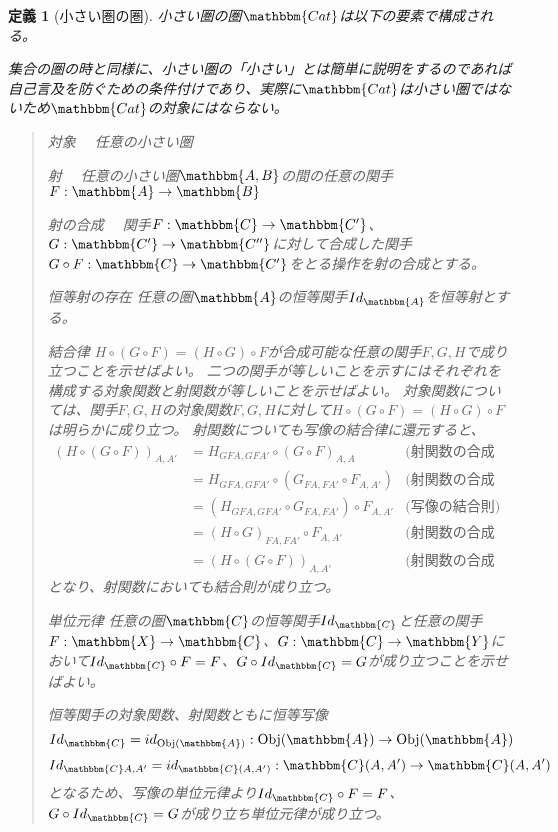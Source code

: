 \documentclass[uplatex,dvipdfmx]{jsarticle}
\newcommand{\cat}[1]{\mathbbm{#1}}
\newcommand{\arrow}{\rightarrow}
\newcommand{\functor}[3]{#1:\cat{#2}\arrow \cat{#3}}
\newcommand{\obj}[1]{\mathrm{Obj}(\cat{#1})}
\newcommand{\mor}[3]{#1:#2\arrow #3}
\newcommand{\arset}[3]{\cat{#1}(#2,#3)}
\newtheorem{define}[proof]{定義}
\numberwithin{proof}{subsection}
\newenvironment{mydescription}
{\begin{description}
  \setlength{\parskip}{0.5cm}
}
{\end{description}}
\begin{document}
	\begin{define}[小さい圏の圏]
		小さい圏の圏$\cat{Cat}$は以下の要素で構成される。

		集合の圏の時と同様に、小さい圏の「小さい」とは簡単に説明をするのであれば自己言及を防ぐための条件付けであり、実際に$\cat{Cat}$は小さい圏ではないため$\cat{Cat}$の対象にはならない。
		\begin{quote}
			\begin{mydescription}
				\item[対象]　任意の小さい圏
				\item[射]　任意の小さい圏$\cat{A,B}$の間の任意の関手$\functor{F}{A}{B}$
				\item[射の合成]　関手$\functor{F}{C}{C'}$、$\functor{G}{C'}{C''}$に対して合成した関手$\functor{G\circ F}{C}{C'}$をとる操作を射の合成とする。
				\item[恒等射の存在]任意の圏$\cat{A}$の恒等関手$Id_{\cat{A}}$を恒等射とする。
				\item[結合律]
				$H\circ (G\circ F)=(H\circ G)\circ F$が合成可能な任意の関手$F,G,H$で成り立つことを示せばよい。
				二つの関手が等しいことを示すにはそれぞれを構成する対象関数と射関数が等しいことを示せばよい。
				対象関数については、関手$F,G,H$の対象関数$F,G,H$に対して$H\circ (G\circ F)=(H\circ G)\circ F$は明らかに成り立つ。
				射関数についても写像の結合律に還元すると、
				\begin{align*}
					(H\circ (G\circ F))_{A,A'}&=H_{GFA,GFA'}\circ (G\circ F)_{A,A}&\text{(射関数の合成の定義)}\\
					&=H_{GFA,GFA'}\circ (G_{FA,FA'}\circ F_{A,A'})&\text{(射関数の合成の定義)}\\
					&=(H_{GFA,GFA'}\circ G_{FA,FA'})\circ F_{A,A'}&\text{(写像の結合則)}\\
					&=(H\circ G)_{FA,FA'}\circ F_{A,A'}&\text{(射関数の合成の定義)}\\
					&=(H\circ (G\circ F))_{A,A'}&\text{(射関数の合成の定義)}
				\end{align*}
				となり、射関数においても結合則が成り立つ。
				\item[単位元律]
				任意の圏$\cat{C}$の恒等関手$Id_{\cat{C}}$と任意の関手$\functor{F}{X}{C}$、$\functor{G}{C}{Y}$において$Id_{\cat{C}}\circ F=F$、$G\circ Id_{\cat{C}}=G$が成り立つことを示せばよい。

				恒等関手の対象関数、射関数ともに恒等写像
				\[\mor{Id_\cat{C}=id_{\obj{A}}}{\obj{A}}{\obj{A}}\]
				\[\mor{Id_{\cat{C}A,A'}=id_{\arset{C}{A}{A'}}}{\arset{C}{A}{A'}}{\arset{C}{A}{A'}}\]
				となるため、写像の単位元律より$Id_{\cat{C}}\circ F=F$、$G\circ Id_{\cat{C}}=G$が成り立ち単位元律が成り立つ。
			\end{mydescription}
		\end{quote}
	\end{define}
\end{document}
